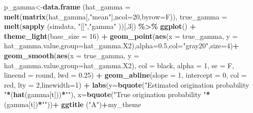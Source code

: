 \documentclass[
]{article}
\newenvironment{Shaded}{\begin{snugshade}}{\end{snugshade}}
\newcommand{\AttributeTok}[1]{\textcolor[rgb]{0.13,0.29,0.53}{#1}}
\newcommand{\DecValTok}[1]{\textcolor[rgb]{0.00,0.00,0.81}{#1}}
\newcommand{\FloatTok}[1]{\textcolor[rgb]{0.00,0.00,0.81}{#1}}
\newcommand{\FunctionTok}[1]{\textcolor[rgb]{0.13,0.29,0.53}{\textbf{#1}}}
\newcommand{\NormalTok}[1]{#1}
\newcommand{\OtherTok}[1]{\textcolor[rgb]{0.56,0.35,0.01}{#1}}
\newcommand{\SpecialCharTok}[1]{\textcolor[rgb]{0.81,0.36,0.00}{\textbf{#1}}}
\newcommand{\StringTok}[1]{\textcolor[rgb]{0.31,0.60,0.02}{#1}}
\begin{document}
{\begin{Shaded}
\begin{Highlighting}[]
\NormalTok{p\_gamma}\OtherTok{\textless{}{-}}\FunctionTok{data.frame}\NormalTok{ (}\AttributeTok{hat\_gamma =} \FunctionTok{melt}\NormalTok{(}\FunctionTok{matrix}\NormalTok{(hat\_gamma[,}\StringTok{"mean"}\NormalTok{],}\AttributeTok{ncol=}\DecValTok{20}\NormalTok{,}\AttributeTok{byrow=}\NormalTok{F)),}
            \AttributeTok{true\_gamma =} \FunctionTok{melt}\NormalTok{(}\FunctionTok{sapply}\NormalTok{ (simdata, }\StringTok{"[["}\NormalTok{,}\StringTok{"gamma"}\NormalTok{ ))[,}\DecValTok{3}\NormalTok{]) }\SpecialCharTok{\%\textgreater{}\%}
  \FunctionTok{ggplot}\NormalTok{() }\SpecialCharTok{+}
  \FunctionTok{theme\_light}\NormalTok{(}\AttributeTok{base\_size =} \DecValTok{16}\NormalTok{) }\SpecialCharTok{+}
  \FunctionTok{geom\_point}\NormalTok{(}\FunctionTok{aes}\NormalTok{(}\AttributeTok{x =}\NormalTok{ true\_gamma, }\AttributeTok{y =}\NormalTok{ hat\_gamma.value,}\AttributeTok{group=}\NormalTok{hat\_gamma.X2),}\AttributeTok{alpha=}\FloatTok{0.5}\NormalTok{,}\AttributeTok{col=}\StringTok{"gray20"}\NormalTok{,}\AttributeTok{size=}\DecValTok{4}\NormalTok{)}\SpecialCharTok{+}
  \FunctionTok{geom\_smooth}\NormalTok{(}\FunctionTok{aes}\NormalTok{(}\AttributeTok{x =}\NormalTok{ true\_gamma, }\AttributeTok{y =}\NormalTok{ hat\_gamma.value,}\AttributeTok{group=}\NormalTok{hat\_gamma.X2), }\AttributeTok{col =} \StringTok{\textquotesingle{}black\textquotesingle{}}\NormalTok{, }\AttributeTok{alpha =} \DecValTok{1}\NormalTok{, }\AttributeTok{se =}\NormalTok{ F, }
              \AttributeTok{lineend =} \StringTok{\textquotesingle{}round\textquotesingle{}}\NormalTok{, }\AttributeTok{lwd =} \FloatTok{0.25}\NormalTok{) }\SpecialCharTok{+}
  \FunctionTok{geom\_abline}\NormalTok{(}\AttributeTok{slope =} \DecValTok{1}\NormalTok{, }\AttributeTok{intercept =} \DecValTok{0}\NormalTok{, }\AttributeTok{col =} \StringTok{\textquotesingle{}red\textquotesingle{}}\NormalTok{, }\AttributeTok{lty =} \DecValTok{2}\NormalTok{,}\AttributeTok{linewidth=}\DecValTok{1}\NormalTok{) }\SpecialCharTok{+}
  \FunctionTok{labs}\NormalTok{(}\AttributeTok{y=}\FunctionTok{bquote}\NormalTok{(}\StringTok{"Estimated origination probability "}\SpecialCharTok{*}\NormalTok{(}\FunctionTok{hat}\NormalTok{(gamma[t]))}\SpecialCharTok{*}\StringTok{""}\NormalTok{),}
       \AttributeTok{x=}\FunctionTok{bquote}\NormalTok{(}\StringTok{"True origination probability "}\SpecialCharTok{*}\NormalTok{(gamma[t])}\SpecialCharTok{*}\StringTok{""}\NormalTok{))}\SpecialCharTok{+}
  \FunctionTok{ggtitle}\NormalTok{ (}\StringTok{"A"}\NormalTok{)}\SpecialCharTok{+}\NormalTok{my\_theme}


\end{Highlighting}
\end{Shaded}}
\end{document}
